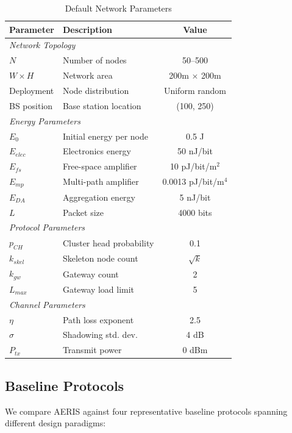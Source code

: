 \begin{table}[htbp]
\centering
\caption{Default Network Parameters}
\label{tab:network_params}
\begin{tabular}{@{}llc@{}}
\toprule
Parameter & Description & Value \\
\midrule
\multicolumn{3}{l}{\textit{Network Topology}} \\
$N$ & Number of nodes & 50--500 \\
$W \times H$ & Network area & 200m $\times$ 200m \\
Deployment & Node distribution & Uniform random \\
BS position & Base station location & (100, 250) \\
\midrule
\multicolumn{3}{l}{\textit{Energy Parameters}} \\
$E_0$ & Initial energy per node & 0.5 J \\
$E_{elec}$ & Electronics energy & 50 nJ/bit \\
$E_{fs}$ & Free-space amplifier & 10 pJ/bit/m$^2$ \\
$E_{mp}$ & Multi-path amplifier & 0.0013 pJ/bit/m$^4$ \\
$E_{DA}$ & Aggregation energy & 5 nJ/bit \\
$L$ & Packet size & 4000 bits \\
\midrule
\multicolumn{3}{l}{\textit{Protocol Parameters}} \\
$p_{CH}$ & Cluster head probability & 0.1 \\
$k_{skel}$ & Skeleton node count & $\sqrt{k}$ \\
$k_{gw}$ & Gateway count & 2 \\
$L_{max}$ & Gateway load limit & 5 \\
\midrule
\multicolumn{3}{l}{\textit{Channel Parameters}} \\
$\eta$ & Path loss exponent & 2.5 \\
$\sigma$ & Shadowing std. dev. & 4 dB \\
$P_{tx}$ & Transmit power & 0 dBm \\
\bottomrule
\end{tabular}
\end{table}

\subsection{Baseline Protocols}

We compare AERIS against four representative baseline protocols spanning
different design paradigms:

